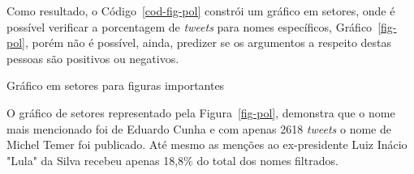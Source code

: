 Como resultado, o Código~\ref{cod-fig-pol} constrói um gráfico em setores, onde é possível verificar a porcentagem de \textit{tweets} para nomes específicos, Gráfico~\ref{fig-pol}, porém não é possível, ainda, predizer se os argumentos a respeito destas pessoas são positivos ou negativos. \\

\begin{grafico}[h]
	\centering
	\caption{Gráfico em setores para figuras importantes}
	\vspace{-0.3cm}
	\label{fig-pol}
\end{grafico}

O gráfico de setores representado pela Figura~\ref{fig-pol}, demonstra que o nome mais mencionado foi de Eduardo Cunha e com apenas 2618 \textit{tweets} o nome de Michel Temer foi publicado. Até mesmo as menções ao ex-presidente Luiz Inácio "Lula" da Silva recebeu apenas 18,8\% do total dos nomes filtrados.






























